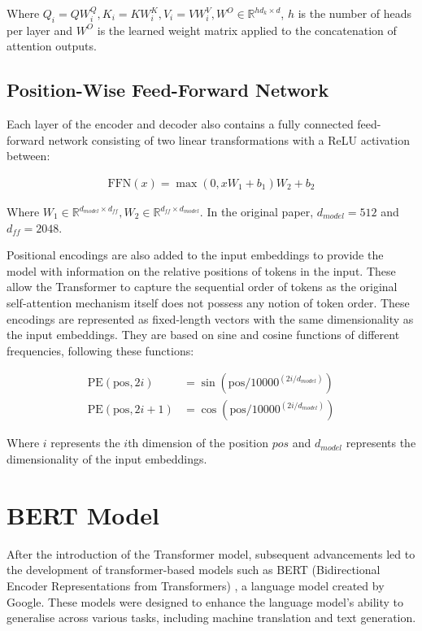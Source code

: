 Where $Q_{i} = QW_{i}^{Q}, K_{i} = KW_{i}^{K}, V_{i} = VW_{i}^{V}, W^{O} \in \mathbb{R}^{hd_{k} \times d}$, $h$ is the number of heads per layer and $W^{O}$ is the learned weight matrix applied to the concatenation of attention outputs.

\subsection{Position-Wise Feed-Forward Network}

Each layer of the encoder and decoder also contains a fully connected feed-forward network consisting of two linear transformations with a ReLU activation between:

\begin{equation}
    \begin{gathered}
        \text{FFN}(x) = \max \left(0, xW_{1} + b_{1}\right)W_{2} + b_{2}
    \end{gathered}
    \label{eq:ffnn}
\end{equation}

Where $W_1 \in \mathbb{R}^{d_{model} \times d_{ff}}, W_2 \in \mathbb{R}^{d_{ff} \times d_{model}}$. In the original paper, $d_{model} = 512$ and $d_{ff} = 2048$.

Positional encodings are also added to the input embeddings to provide the model with information on the relative positions of tokens in the input. These allow the Transformer to capture the sequential order of tokens as the original self-attention mechanism itself does not possess any notion of token order. These encodings are represented as fixed-length vectors with the same dimensionality as the input embeddings. They are based on sine and cosine functions of different frequencies, following these functions:

\begin{equation}
    \begin{aligned}
        \text{PE}(\text{pos}, 2i)     & = \sin\left(\text{pos} / 10000^{(2i/d_{model})}\right) \\
        \text{PE}(\text{pos}, 2i + 1) & = \cos\left(\text{pos} / 10000^{(2i/d_{model})}\right)
    \end{aligned}
    \label{eq:pos_embedding}
\end{equation}

Where $i$ represents the $i$th dimension of the position $pos$ and $d_{model}$ represents the dimensionality of the input embeddings.

\section{BERT Model}
\label{sec:BERT}
After the introduction of the Transformer model, subsequent advancements led to the development of transformer-based models such as BERT (Bidirectional Encoder Representations from Transformers) \cite{BERT}, a language model created by Google. These models were designed to enhance the language model's ability to generalise across various tasks, including machine translation and text generation.

